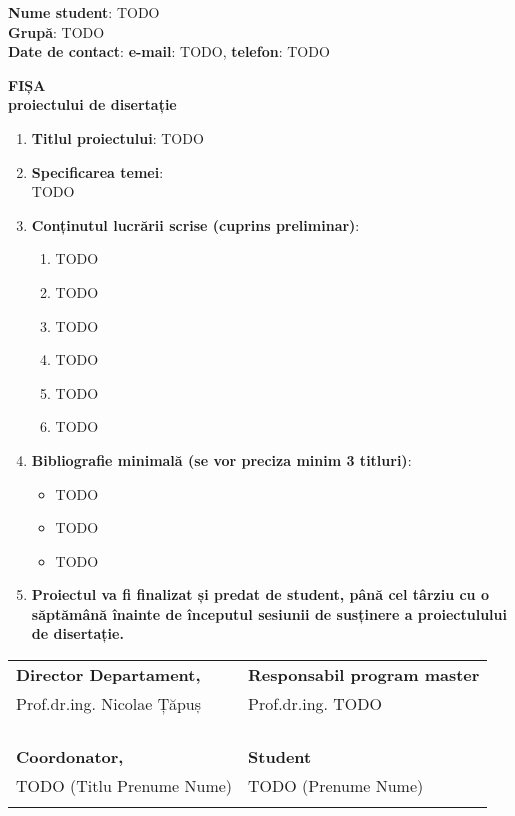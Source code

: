 \documentclass[12pt]{cse-form}
\begin{document}
\textbf{Nume student}: TODO \\
\textbf{Grupă}: TODO \\
\textbf{Date de contact}: \textbf{e-mail}: TODO, \textbf{telefon}: TODO

\vspace{7mm}

\begin{center}
  \large{\textbf{FIȘA\\
  proiectului de disertație}}
\end{center}

\vspace{7mm}

\begin{enumerate}
  \item \textbf{Titlul proiectului}: TODO
  \item \textbf{Specificarea temei}:\\
    TODO
  \item \textbf{Conținutul lucrării scrise (cuprins preliminar)}:
    \begin{enumerate}
      \item TODO
      \item TODO
      \item TODO
      \item TODO
      \item TODO
      \item TODO
    \end{enumerate}
  \item \textbf{Bibliografie minimală (se vor preciza minim 3 titluri)}:
    \begin{itemize}
      \item TODO
      \item TODO
      \item TODO
    \end{itemize}
  \item \textbf{Proiectul va fi finalizat și predat de student, până cel
      târziu cu o săptămână înainte de începutul sesiunii de susținere a
    proiectulului de disertație.}
\end{enumerate}

\vspace{10mm}

\begin{center}
  \begin{tabular}{@{}p{}p{}@{}}
    \textbf{Director Departament,} & \textbf{Responsabil program master} \\
    Prof.dr.ing. Nicolae Țăpuș & Prof.dr.ing. TODO \\
    & \\
    & \\
    & \\
    & \\
    \textbf{Coordonator,} & \textbf{Student} \\
    TODO (Titlu Prenume Nume) & TODO (Prenume Nume) \\
    & \\
  \end{tabular}
\end{center}
\end{document}

